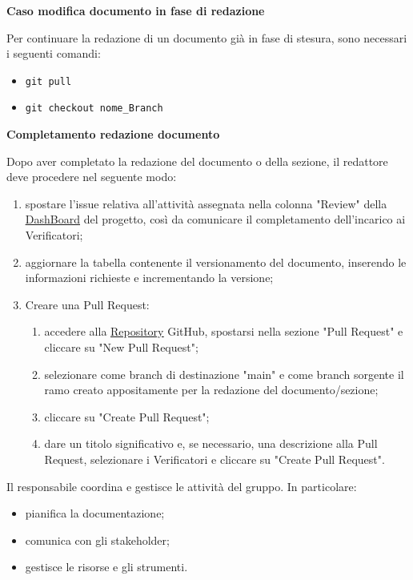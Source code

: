 \newpage
\begin{flushleft}
\textbf{Caso modifica documento in fase di redazione}
\end{flushleft}
Per continuare la redazione di un documento già in fase di stesura, sono necessari i seguenti comandi:
\begin{itemize}
	\item \texttt{git pull}
	\item \texttt{git checkout nome\_Branch}
\end{itemize}
\begin{flushleft}
\textbf{Completamento redazione documento}
\end{flushleft}
Dopo aver completato la redazione del documento o della sezione, il redattore deve procedere nel seguente modo:
\begin{enumerate}
	\item spostare l'issue relativa all'attività assegnata nella colonna "Review" della \href{https://github.com/orgs/7Last/projects/1/views/1}{\underline{DashBoard}} del progetto, così da comunicare il completamento dell'incarico ai Verificatori;
	\item aggiornare la tabella contenente il versionamento del documento, inserendo le informazioni richieste e incrementando la versione;
	\item Creare una Pull Request:
	      \begin{enumerate}
		      \item accedere alla \href{https://github.com/7Last/docs}{\underline{Repository}} GitHub, spostarsi nella sezione "Pull Request" e cliccare su "New Pull Request";
		      \item selezionare come branch di destinazione "main" e come branch sorgente il ramo creato appositamente per la redazione del documento/sezione;
		      \item cliccare su "Create Pull Request";
		      \item dare un titolo significativo e, se necessario, una descrizione alla Pull Request, selezionare i Verificatori e cliccare su "Create Pull Request".
	      \end{enumerate}
\end{enumerate}
\newpage
{}
Il responsabile coordina e gestisce le attività del gruppo. In particolare:
\begin{itemize}
	\item pianifica la documentazione;
	\item comunica con gli stakeholder;
	\item gestisce le risorse e gli strumenti.
\end{itemize}

